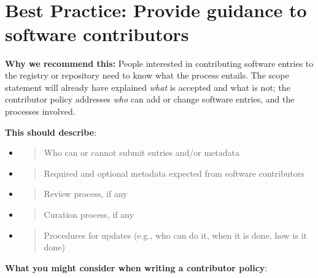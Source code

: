 \documentclass[]{article}
\begin{document}
\section{\texorpdfstring{\\
}{ }}\label{section-4}

\newpage
\section{Best Practice: Provide guidance to software
contributors}\label{best-practice-provide-guidance-to-software-contributors}

\textbf{Why we recommend this:} People interested in contributing
software entries to the registry or repository need to know what the
process entails. The scope statement will already have explained
\emph{what} is accepted and what is not; the contributor policy
addresses \emph{who} can add or change software entries, and the
processes involved.

\textbf{This should describe}:

\begin{itemize}
\item
  \begin{quote}
  Who can or cannot submit entries and/or metadata
  \end{quote}
\item
  \begin{quote}
  Required and optional metadata expected from software contributors
  \end{quote}
\item
  \begin{quote}
  Review process, if any
  \end{quote}
\item
  \begin{quote}
  Curation process, if any
  \end{quote}
\item
  \begin{quote}
  Procedures for updates (e.g., who can do it, when it is done, how is
  it done)
  \end{quote}
\end{itemize}

\textbf{What you might consider when writing a contributor policy}:
\end{document}

